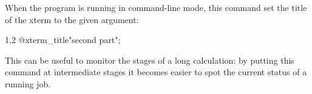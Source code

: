 
When the program is running in command-line mode, this command
set the title of the xterm to the given argument: 
\begin{screen}{1,2}
@xterm_title{"second part"};
\end{screen}
This can be useful to monitor the stages of a long calculation: by
putting this command at intermediate stages it becomes easier to spot
the current status of a running job.


